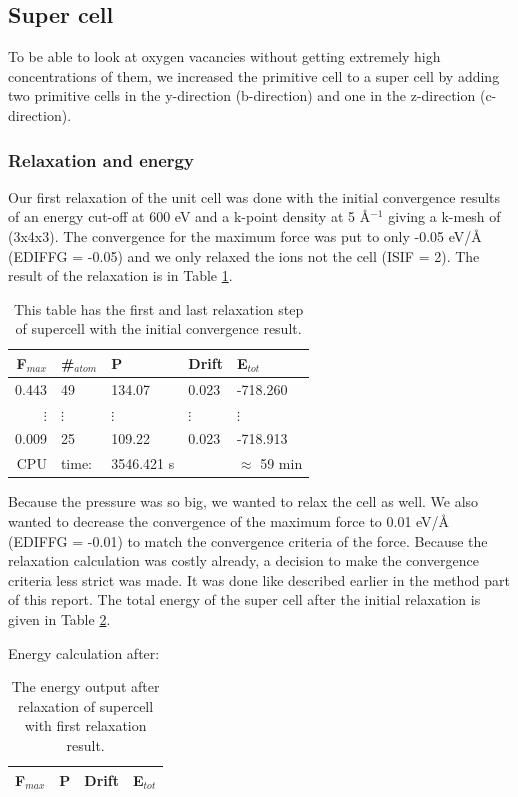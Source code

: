 \subsection{Super cell}

To be able to look at oxygen vacancies without getting extremely high concentrations of them, we increased the primitive cell to a super cell by adding two primitive cells in the y-direction (b-direction) and one in the z-direction (c-direction). 

\subsubsection{Relaxation and energy}

Our first relaxation of the unit cell was done with the initial convergence results of an energy cut-off at 600 eV and a k-point density at 5 Å$^{-1}$ giving a k-mesh of (3x4x3). The convergence for the maximum force was put to only -0.05 eV/Å (EDIFFG = -0.05) and we only relaxed the ions not the cell (ISIF = 2). The result of the relaxation is in Table \ref{tab:ionstep_convergence}.

\begin{table}[H]\caption{This table has the first and last relaxation step of supercell with the initial convergence result.}\label{tab:ionstep_convergence}
\begin{tabular}{rllll}
F$_{max}$ &\#$_{atom}$&	P&	Drift&	E$_{tot}$\\ \hline
0.443&	49&	134.07&	0.023&	-718.260\\
$\vdots$&$\vdots$&$\vdots$&$\vdots$&$\vdots$\\
0.009&	25&	109.22&	0.023&	-718.913\\
CPU &time: & 3546.421 s & & $\approx$ 59 min  \\
\end{tabular}
\end{table}

Because the pressure was so big, we wanted to relax the cell as well. We also wanted to decrease the convergence of the maximum force to 0.01 eV/Å (EDIFFG = -0.01) to match the convergence criteria of the force. Because the relaxation calculation was costly already, a decision to make the convergence criteria less strict was made. It was done like described earlier in the method part of this report. The total energy of the super cell after the initial relaxation is given in Table \ref{tab:energy_supercell_after_relax}.

Energy calculation after:
\begin{table}[H]\caption{The energy output after relaxation of supercell with first relaxation result.}\label{tab:energy_supercell_after_relax}
\begin{tabular}{llll}
F$_{max}$ & P&	Drift&	E$_{tot}$\\ \hline
\end{tabular}
\end{table}

